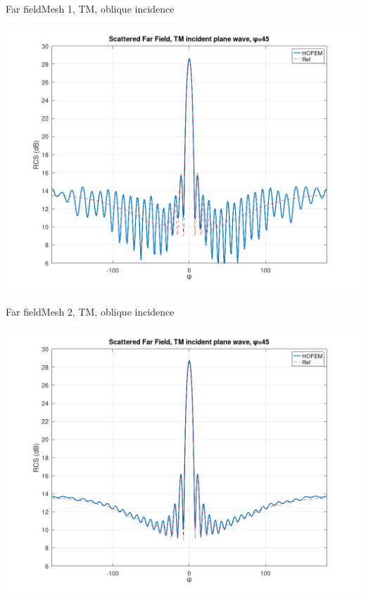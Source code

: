 
\begin{frame}{Far field}{Mesh 1, TM, oblique incidence}

\includegraphics[width=0.9\linewidth]{results/pec_y_malla_gorda_45_TM/FF.png}
  
\end{frame}
  

\begin{frame}{Far field}{Mesh 2, TM, oblique incidence}

\includegraphics[width=0.9\linewidth]{results/pec_y_malla_fina_45_TM/FF.png}
  
\end{frame}

